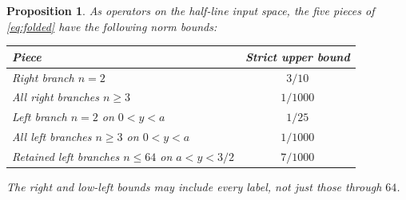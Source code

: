 \documentclass[11pt]{article}
\newtheorem{proposition}[theorem]{Proposition}
\theoremstyle{remark}\newtheorem{remark}[theorem]{Remark}
\numberwithin{equation}{section}
\begin{document}
\begin{proposition}\label{prop:branches}
As operators on the half-line input space, the five pieces of \eqref{eq:folded} have the following norm bounds:
\begin{center}
\begin{tabular}{lc}
\toprule
Piece & Strict upper bound\\
\midrule
Right branch $n=2$ & $3/10$\\
All right branches $n\ge3$ & $1/1000$\\
Left branch $n=2$ on $0<y<a$ & $1/25$\\
All left branches $n\ge3$ on $0<y<a$ & $1/1000$\\
Retained left branches $n\le64$ on $a<y<3/2$ & $7/1000$\\
\bottomrule
\end{tabular}
\end{center}
The right and low-left bounds may include every label, not just those through $64$.
\end{proposition}
\end{document}
